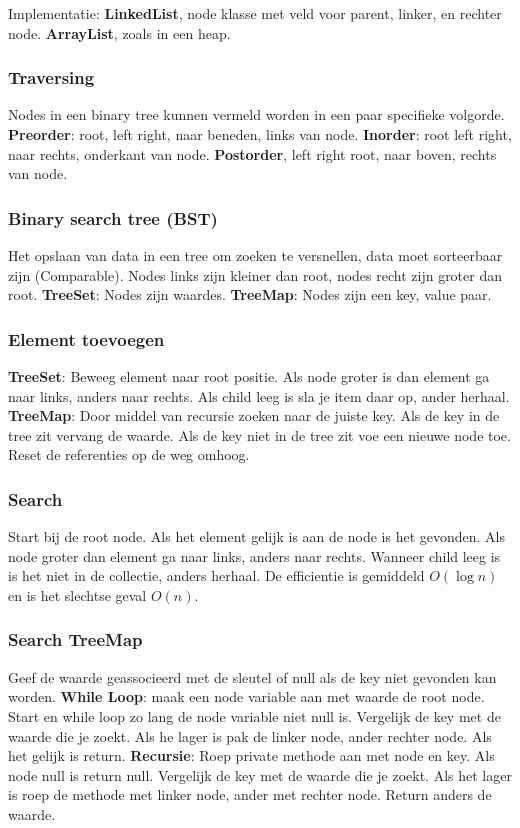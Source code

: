 Implementatie: \textbf{LinkedList}, node klasse met veld voor parent, linker, en rechter node.
\textbf{ArrayList}, zoals in een heap.

\subsubsection{Traversing}
Nodes in een binary tree kunnen vermeld worden in een paar specifieke volgorde.
\textbf{Preorder}: root, left right, naar beneden, links van node.
\textbf{Inorder}: root left right, naar rechts, onderkant van node.
\textbf{Postorder}, left right root, naar boven, rechts van node.

\subsubsection{Binary search tree (BST)}
Het opslaan van data in een tree om zoeken te versnellen, data moet sorteerbaar zijn (Comparable).
Nodes links zijn kleiner dan root, nodes recht zijn groter dan root.
\textbf{TreeSet}: Nodes zijn waardes.
\textbf{TreeMap}: Nodes zijn een key, value paar.

\subsubsection{Element toevoegen}
\textbf{TreeSet}: Beweeg element naar root positie.
Als node groter is dan element ga naar links, anders naar rechts.
Als child leeg is sla je item daar op, ander herhaal.
\textbf{TreeMap}: Door middel van recursie zoeken naar de juiste key.
Als de key in de tree zit vervang de waarde.
Als de key niet in de tree zit voe een nieuwe node toe.
Reset de referenties op de weg omhoog.

\subsubsection{Search}
Start bij de root node.
Als het element gelijk is aan de node is het gevonden.
Als node groter dan element ga naar links, anders naar rechts.
Wanneer child leeg is is het niet in de collectie, anders herhaal.
De efficientie is gemiddeld $O(\log n)$ en is het slechtse geval $O(n)$.

\subsubsection{Search TreeMap}
Geef de waarde geassocieerd met de sleutel of null als de key niet gevonden kan worden.
\textbf{While Loop}: maak een node variable aan met waarde de root node.
Start en while loop zo lang de node variable niet null is.
Vergelijk de key met de waarde die je zoekt.
Als he lager is pak de linker node, ander rechter node.
Als het gelijk is return.
\textbf{Recursie}: Roep private methode aan met node en key.
Als node null is return null.
Vergelijk de key met de waarde die je zoekt.
Als het lager is roep de methode met linker node, ander met rechter node.
Return anders de waarde.

